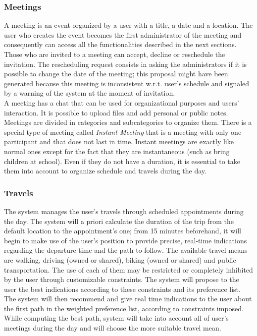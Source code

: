 
\subsubsection{Meetings}
A meeting is an event organized by a user with a title, a date and a location. The user who creates the event becomes the first administrator of the meeting and consequently can access all the functionalities described in the next sections. Those who are invited to a meeting can accept, decline or reschedule the invitation. The rescheduling request consists in asking the administrators if it is possible to change the date of the meeting; this proposal might have been generated because this meeting is inconsistent w.r.t. user's schedule and signaled by a warning of the system at the moment of invitation. \\
A meeting has a chat that can be used for organizational purposes and users' interaction. It is possible to upload files and add personal or public notes.\\
Meetings are divided in categories and subcategories to organize them. There is a special type of meeting called \textit{Instant Meeting} that is a meeting with only one participant and that does not last in time. Instant meetings are exactly like normal ones except for the fact that they are instantaneous (such as bring children at school). Even if they do not have a duration, it is essential to take them into account to organize schedule and travels during the day.

\subsubsection{Travels}

The system manages the user's travels through scheduled appointments during the day. The system will a priori calculate the duration of the trip from the default location to the appointment's one; from 15 minutes beforehand, it will begin to make use of the user's position to provide precise, real-time indications regarding the departure time and the path to follow. The available travel means are walking, driving (owned or shared), biking (owned or shared) and public transportation. The use of each of them may be restricted or completely inhibited by the user through customizable constraints. The system will propose to the user the best indications according to these constraints and its preference list. The system will then recommend and give real time indications to the user about the first path in the weighted preference list, according to constraints imposed. While computing the best path, system will take into account all of user's meetings during the day and will choose the more suitable travel mean.
